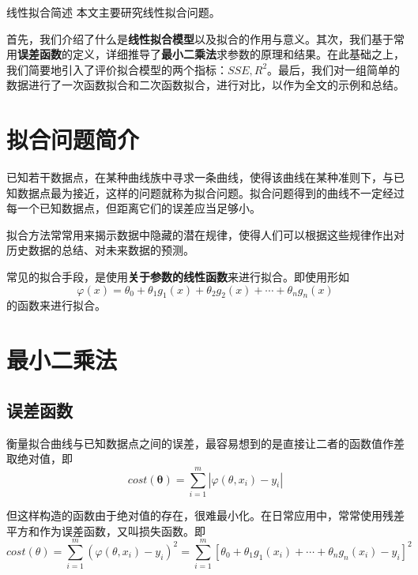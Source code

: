 \documentclass[withoutpreface]{cumcmthesis}
\begin{document}
\begin{abstractpage}{线性拟合简述}
    本文主要研究线性拟合问题。
    
    首先，我们介绍了什么是\textbf{线性拟合模型}以及拟合的作用与意义。其次，我们基于常用\textbf{误差函数}的定义，详细推导了\textbf{最小二乘法}求参数的原理和结果。在此基础之上，我们简要地引入了评价拟合模型的两个指标：$SSE,R^2$。最后，我们对一组简单的数据进行了一次函数拟合和二次函数拟合，进行对比，以作为全文的示例和总结。

\end{abstractpage}

\tocpage 
\section{拟合问题简介}

已知若干数据点，在某种曲线族中寻求一条曲线，使得该曲线在某种准则下，与已知数据点最为接近，这样的问题就称为拟合问题。拟合问题得到的曲线不一定经过每一个已知数据点，但距离它们的误差应当足够小。

拟合方法常常用来揭示数据中隐藏的潜在规律，使得人们可以根据这些规律作出对历史数据的总结、对未来数据的预测。

常见的拟合手段，是使用\textbf{关于参数的线性函数}来进行拟合。即使用形如
\begin{equation}
    \varphi(x) = \theta_0 + \theta_1g_1(x) + \theta_2g_2(x)+\cdots+\theta_n g_n(x)
\end{equation}
的函数来进行拟合。

\section{最小二乘法}

\subsection{误差函数}
衡量拟合曲线与已知数据点之间的误差，最容易想到的是直接让二者的函数值作差取绝对值，即
$$cost(\mathbf{\theta}) = \sum\limits_{i=1}^m |\varphi(\theta,x_i)-y_i|$$

但这样构造的函数由于绝对值的存在，很难最小化。在日常应用中，常常使用残差平方和作为误差函数，又叫损失函数。即
\begin{equation}\label{Eq:1}
    cost(\theta) = \sum \limits_{i=1}^m (\varphi(\theta,x_i)-y_i)^2
    = \sum \limits_{i=1}^m[\theta_0 + \theta_1g_1(x_i) +\cdots+\theta_n g_n(x_i)-y_i]^2
\end{equation}
\end{document}

